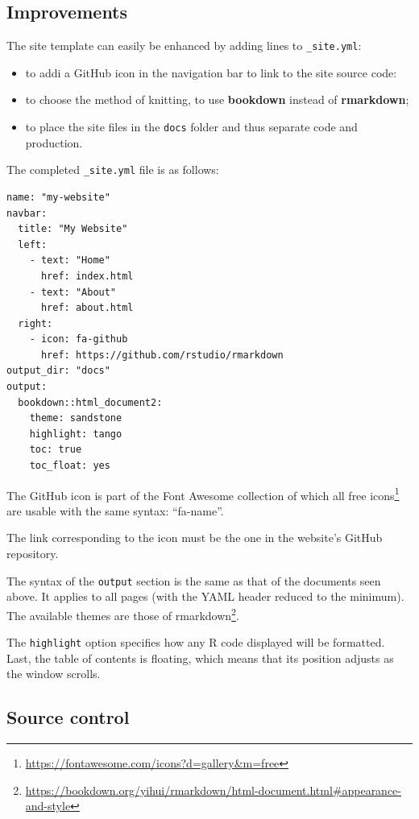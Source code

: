 \documentclass[
  12pt,
  american,
  a4paper,
  extrafontsizes,onecolumn,openright
  ]{memoir}
\providecommand{\tightlist}{%
  \setlength{\itemsep}{0pt}\setlength{\parskip}{0pt}}
\begin{document}
\hypertarget{improvements}{%
\subsection{Improvements}\label{improvements}}

The site template can easily be enhanced by adding lines to \texttt{\_site.yml}:

\begin{itemize}
\tightlist
\item
  to addi a GitHub icon in the navigation bar to link to the site source code:
\item
  to choose the method of knitting, to use \textbf{bookdown} instead of \textbf{rmarkdown};
\item
  to place the site files in the \texttt{docs} folder and thus separate code and production.
\end{itemize}

The completed \texttt{\_site.yml} file is as follows:

\begin{verbatim}
name: "my-website"
navbar:
  title: "My Website"
  left:
    - text: "Home"
      href: index.html
    - text: "About"
      href: about.html
  right:
    - icon: fa-github
      href: https://github.com/rstudio/rmarkdown
output_dir: "docs"
output:
  bookdown::html_document2:
    theme: sandstone
    highlight: tango
    toc: true
    toc_float: yes
\end{verbatim}

The GitHub icon is part of the Font Awesome collection of which all free icons\footnote{\url{https://fontawesome.com/icons?d=gallery\&m=free}} are usable with the same syntax: \enquote{fa-name}.

The link corresponding to the icon must be the one in the website's GitHub repository.

The syntax of the \texttt{output} section is the same as that of the documents seen above.
It applies to all pages (with the YAML header reduced to the minimum).
The available themes are those of rmarkdown\footnote{\url{https://bookdown.org/yihui/rmarkdown/html-document.html\#appearance-and-style}}.

The \texttt{highlight} option specifies how any R code displayed will be formatted.
Last, the table of contents is floating, which means that its position adjusts as the window scrolls.

\hypertarget{source-control}{%
\subsection{Source control}\label{source-control}}
\end{document}
